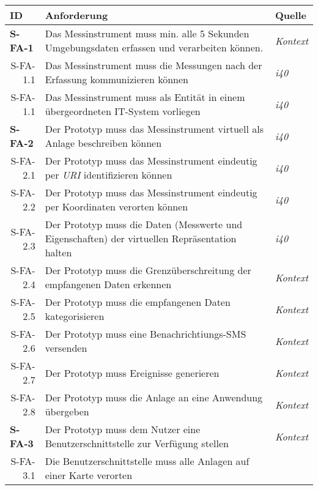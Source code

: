   \begin{tabularx}{\textwidth}{@{}lXp{2cm}@{}}
      \toprule
      ID                & Anforderung & Quelle \\
      \midrule
      \endhead
      \textbf{S-FA-1} \label{sfa1}             &  Das Messinstrument muss min. alle 5 Sekunden Umgebungsdaten erfassen und verarbeiten können.   &  \textit{Kontext}     \\
      \multicolumn{1}{r}{S-FA-1.1} &   Das Messinstrument muss die Messungen nach der Erfassung kommunizieren können & \textit{\ac{i40}}\\
      \multicolumn{1}{r}{S-FA-1.1} &   Das Messinstrument muss als Entität in einem übergeordneten IT-System vorliegen & \textit{\ac{i40}}\\
      \textbf{S-FA-2}              &   Der Prototyp muss das Messinstrument virtuell als Anlage beschreiben können & \textit{\ac{i40}}        \\
      \multicolumn{1}{r}{S-FA-2.1} &   Der Prototyp muss das Messinstrument eindeutig per \textit{URI} identifizieren können  & \textit{\ac{i40}}\\
      \multicolumn{1}{r}{S-FA-2.2} &   Der Prototyp muss das Messinstrument eindeutig per Koordinaten verorten können  & \textit{\ac{i40}}\\
      \multicolumn{1}{r}{S-FA-2.3} & Der Prototyp muss die Daten (Messwerte und Eigenschaften) der virtuellen Repräsentation halten  & \textit{\ac{i40}} \\
      \multicolumn{1}{r}{S-FA-2.4} & Der Prototyp muss die Grenzüberschreitung der empfangenen Daten erkennen &  \textit{Kontext}\\
      \multicolumn{1}{r}{S-FA-2.5} & Der Prototyp muss die empfangenen Daten kategorisieren &  \textit{Kontext}\\
      \multicolumn{1}{r}{S-FA-2.6} & Der Prototyp muss eine Benachrichtiungs-SMS versenden  &  \textit{Kontext}\\
      \multicolumn{1}{r}{S-FA-2.7} & Der Prototyp muss Ereignisse generieren  &  \textit{Kontext}\\
      \multicolumn{1}{r}{S-FA-2.8} & Der Prototyp muss die Anlage an eine Anwendung übergeben &  \textit{Kontext} \\
      \textbf{S-FA-3}              &  Der Prototyp muss dem Nutzer eine Benutzerschnittstelle zur Verfügung stellen    & \textit{Kontext}  \\
      \multicolumn{1}{r}{S-FA-3.1} &  Die Benutzerschnittstelle muss alle Anlagen auf einer Karte verorten \\

\end{tabularx}
